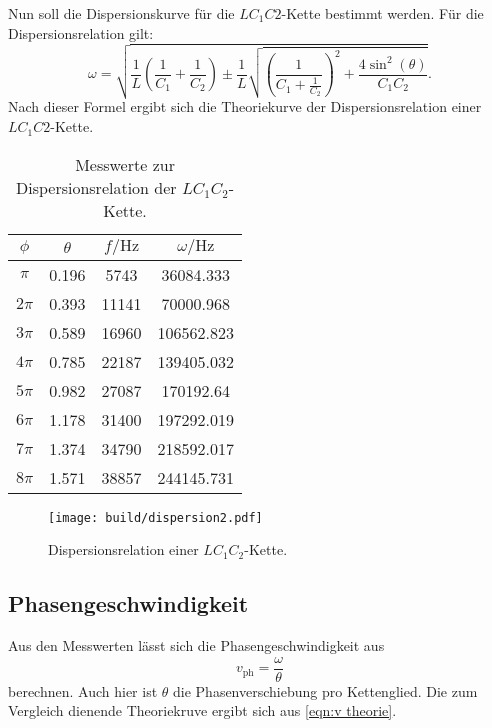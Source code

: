  Nun soll die Dispersionskurve für die $LC_{1}C{2}$-Kette bestimmt werden.
 Für die Dispersionsrelation gilt:
 \begin{equation}
  \omega = \sqrt{\frac{1}{L}\left(\frac{1}{C_{1}}+\frac{1}{C_{2}}\right)\pm\frac{1}{L}\sqrt{\left(\frac{1}{C_{1}+\frac{1}{C_2}}\right)^2 + \frac{4\sin^2(\theta)}{C_{1}C_{2}}}}.
  \end{equation}
  Nach dieser Formel ergibt sich die Theoriekurve der Dispersionsrelation einer $LC_{1}C{2}$-Kette.

\begin{table}
  \centering
  \caption{Messwerte zur Dispersionsrelation der $LC_{1}C_{2}$-Kette.}
  \label{tab:dispersion2}
  \begin{tabular}{c c c c}
    \toprule
    $\phi$ & $\theta$ & $f / \si{\hertz}$ & $\omega / \si{\hertz}$ \\
    \midrule
    $\pi$ & 0.196 & 5743 & 36084.333 \\
    $2\pi$ & 0.393 & 11141 & 70000.968 \\
    $3\pi$ & 0.589 & 16960 & 106562.823 \\
    $4\pi$ & 0.785 & 22187 & 139405.032 \\
    $5\pi$ & 0.982 & 27087 & 170192.64 \\
    $6\pi$ & 1.178 & 31400 & 197292.019 \\
    $7\pi$ & 1.374 & 34790 & 218592.017 \\
    $8\pi$ & 1.571 & 38857 & 244145.731 \\
    \bottomrule
    \end{tabular}
  \end{table}

  \begin{figure}
    \centering
    \texttt{[image: build/dispersion2.pdf]}
  \caption{Dispersionsrelation einer $LC_{1}C_{2}$-Kette.}
    \label{fig:dispersion-lc1c2}
  \end{figure}

  \subsection{Phasengeschwindigkeit}
  Aus den Messwerten lässt sich die Phasengeschwindigkeit aus
  \begin{equation}
    v_\mathrm{ph} = \frac{\omega}{\theta}
  \end{equation}
  berechnen. Auch hier ist $\theta$ die Phasenverschiebung pro Kettenglied.
  Die zum Vergleich dienende Theoriekruve ergibt sich aus \ref{eqn:v theorie}.


